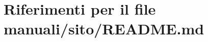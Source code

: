 \hypertarget{manuali_2sito_2README_8md}{}\section{Riferimenti per il file manuali/sito/\+R\+E\+A\+D\+ME.md}
\label{manuali_2sito_2README_8md}
